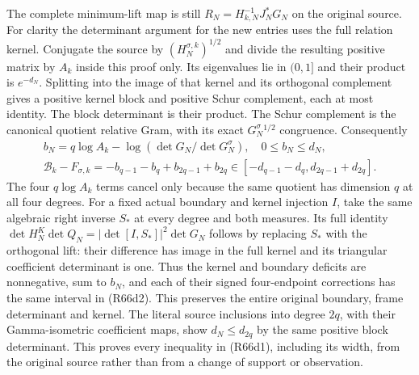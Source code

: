 The complete minimum-lift map is still
$R_N=H_{k,N}^{-1}J_N^*G_N$ on the original source.
For clarity the determinant argument for the new entries
uses the full relation kernel. Conjugate the source by
$(H_N^{\sigma,k})^{1/2}$ and divide the resulting positive
matrix by $A_k$ inside this proof only. Its eigenvalues
lie in $(0,1]$ and their product is $e^{-d_N}$.
Splitting into the image of that kernel and its orthogonal
complement gives a positive kernel block and positive
Schur complement, each at most identity. The block
determinant is their product. The Schur complement is
the canonical quotient relative Gram, with its exact
$G_N^\sigma{}^{1/2}$ congruence. Consequently
\[
\begin{gathered}
 b_N=q\log A_k-\log(\det G_N/\det G_N^\sigma),
 \quad 0\leq b_N\leq d_N,\\
 \mathcal B_k-F_{\sigma,k}
       =-b_{q-1}-b_q+b_{2q-1}+b_{2q}
       \in[-d_{q-1}-d_q,d_{2q-1}+d_{2q}].
\end{gathered}\tag{R66d2}
\]
The four $q\log A_k$ terms cancel only because the same
quotient has dimension $q$ at all four degrees.
For a fixed actual boundary and kernel injection $I$,
take the same algebraic right inverse $S_*$ at every
degree and both measures. Its full identity
$\det H_N^K\det Q_N=|\det[I,S_*]|^2\det G_N$
follows by replacing $S_*$ with the orthogonal lift:
their difference has image in the full kernel and its
triangular coefficient determinant is one. Thus the
kernel and boundary deficits are nonnegative, sum to
$b_N$, and each of their signed four-endpoint corrections
has the same interval in (R66d2). This preserves the
entire original boundary, frame determinant and kernel.
The literal source inclusions into degree $2q$, with
their Gamma-isometric coefficient maps, show
$d_N\leq d_{2q}$ by the same positive block determinant.
This proves every inequality in (R66d1), including its
width, from the original source rather than from a
change of support or observation.

